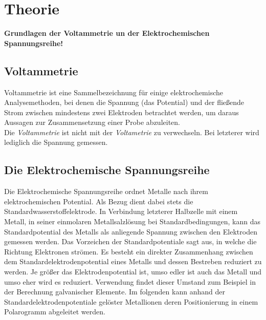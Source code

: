 \section{Theorie}
\label{sec:theorie}
\textbf{Grundlagen der Voltammetrie un der Elektrochemischen Spannungsreihe!}\\
\subsection{Voltammetrie}
Voltammetrie ist eine Sammelbezeichnung für einige elektrochemische Analysemethoden, bei denen die Spannung (das Potential) und der fließende Strom zwischen mindestens zwei Elektroden betrachtet werden, um daraus Aussagen zur Zusammensetzung einer Probe abzuleiten.\\
Die \textit{Voltammetrie} ist nicht mit der \textit{Voltametrie} zu verwechseln. Bei letzterer wird lediglich die Spannung gemessen.
\subsection{Die Elektrochemische Spannungsreihe}

Die Elektrochemische Spannungsreihe ordnet Metalle nach ihrem elektrochemischen Potential. Als Bezug dient dabei stets die Standardwasserstoffelektrode. In Verbindung letzterer Halbzelle mit einem Metall, in seiner einmolaren Metallsalzlösung bei Standardbedingungen, kann das Standardpotential des Metalls als anliegende Spannung zwischen den Elektroden gemessen werden. Das Vorzeichen der Standardpotentiale sagt aus, in welche die Richtung Elektronen strömen. Es besteht ein direkter Zusammenhang zwischen dem Standardelektrodenpotential eines Metalls und dessen Bestreben reduziert zu werden. Je größer das Elektrodenpotential ist, umso edler ist auch das Metall und umso eher wird es reduziert. Verwendung findet dieser Umstand zum Beispiel in der Berechnung galvanischer Elemente. Im folgenden kann anhand der Standardelektrodenpotentiale gelöster Metallionen deren Positionierung in einem Polarogramm abgeleitet werden.\cite{spannungsreihe}\\

\vline

